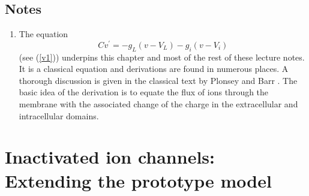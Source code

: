 \section{Notes}

\begin{enumerate}
\item
The equation
\begin{equation}
Cv^{\prime}=-g_{L}\left(  v-V_{L}\right)  -g_{i}(v-V_{i}) 
\end{equation}
(see (\ref{v1})) underpins this chapter and most of the rest of these lecture notes. It is a classical equation
and derivations are found in numerous places. A thorough discussion is given in the classical text by Plonsey and Barr \cite{Plonsey2007}.
The basic idea of the derivation is to equate the flux of ions through the membrane with the associated change of the charge in the extracellular
and intracellular domains.
\end{enumerate}



\chapter[Inactivated ion channels]{Inactivated ion channels: Extending the prototype model}
\label{inactivated}

